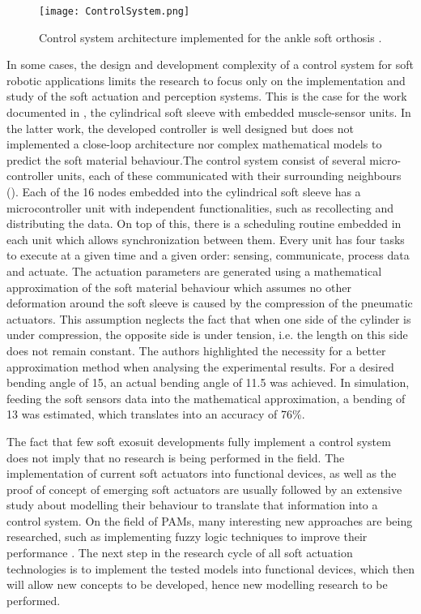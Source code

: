 \begin{figure}[hbtp!]
    \centering
    \texttt{[image: ControlSystem.png]}
    \caption[Control system architecture implemented for the ankle soft orthosis.]{Control system architecture implemented for the ankle soft orthosis \cite{park2011bio}. }
    \label{fig:control_system}
\end{figure}

In some cases, the design and development complexity of a control system for soft robotic applications limits the research to focus only on the implementation and study of the soft actuation and perception systems. This is the case for the work documented in \cite{Park2012}, the cylindrical soft sleeve with embedded muscle-sensor units. In the latter work, the developed controller is well designed but does not implemented a close-loop architecture nor complex mathematical models to predict the soft material behaviour.The control system consist of several micro-controller units, each of these communicated with their surrounding neighbours (). Each of the 16 nodes embedded into the cylindrical soft sleeve has a microcontroller unit with independent functionalities, such as recollecting and distributing the data. On top of this, there is a scheduling routine embedded in each unit which allows synchronization between them. Every unit has four tasks to execute at a given time and a given order: sensing, communicate, process data and actuate. The actuation parameters are generated using a mathematical approximation of the soft material behaviour which assumes no other deformation around the soft sleeve is caused by the compression of the pneumatic actuators. This assumption neglects the fact that when one side of the cylinder is under compression, the opposite side is under tension, i.e. the length on this side does not remain constant. The authors highlighted the necessity for a better approximation method when analysing the experimental results. For a desired bending angle of 15\textdegree{}, an actual bending angle of 11.5\textdegree{} was achieved. In simulation, feeding the soft sensors data into the mathematical approximation, a bending of 13\textdegree{} was estimated, which translates into an accuracy of 76\%.

The fact that few soft exosuit developments fully implement a control system does not imply that no research is being performed in the field. The implementation of current soft actuators into functional devices, as well as the proof of concept of emerging soft actuators are usually followed by an extensive study about modelling their behaviour to translate that information into a control system. On the field of PAMs, many interesting new approaches are being researched, such as implementing fuzzy logic techniques to improve their performance \cite{Chang2015,Skorina2015,Bishop-Moser2015,Hosovsky2016}. The next step in the research cycle of all soft actuation technologies is to implement the tested models into functional devices, which then will allow new concepts to be developed, hence new modelling research to be performed.

